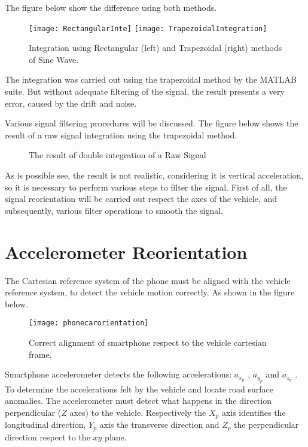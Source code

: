 \documentclass[tesi]{subfiles}
\begin{document}
The figure below show the difference using both methods.

\begin{figure}[H]
\centering
\texttt{[image: RectangularInte]}
\hspace{0.5cm}
\texttt{[image: TrapezoidalIntegration]}
\caption{Integration using Rectangular (left) and Trapezoidal (right) methods of Sine Wave.}
\label{fig:Rectangular and Trapezoidal Integration}
\end{figure}

The integration was carried out using the trapezoidal method by the MATLAB suite. But without adequate filtering of the signal, the result presents a very error, caused by the drift and noise. 

Various signal filtering procedures will be discussed. The figure below shows the result of a raw signal integration using the  trapezoidal method.

\begin{figure}[H]
  \centering
  

  \caption{The result of double integration of a Raw Signal}
  \label{fig:Integration of Raw Data}
\end{figure}

As is possible see, the result is not realistic, considering it is vertical acceleration, so it is necessary to perform various steps to filter the signal. First of all, the signal reorientation will be carried out respect the axes of the vehicle, and subsequently, various filter operations to smooth the signal.

\section{Accelerometer Reorientation} \label{sc:Accelerometer Reorientation}
The Cartesian reference system of the phone must be aligned with the vehicle reference system, to detect the vehicle motion correctly.
As shown in the figure below.

\begin{figure}[H]
  \centering
  \texttt{[image: phonecarorientation]}  
  \caption{Correct alignment of smartphone respect to the vehicle cartesian frame.}
  \label{fig:Smartphone cartesian frame alignment respect Car axis.}
\end{figure}
\noindent Smartphone accelerometer detects the following accelerations: $a_{x_{p}}$ , $a_{y_{p}}$ and $a_{z_{p}}$ . To determine the accelerations felt by the vehicle and locate road surface anomalies. The accelerometer must detect what happens in the direction perpendicular ($Z$ axes) to the vehicle\cite{mohan2008nericell}.
Respectively the $X_{p}$ axis identifies the longitudinal direction, $Y_{p}$ axis the transverse direction and $Z_{p}$ the perpendicular direction respect to the $xy$ plane.
\end{document}
